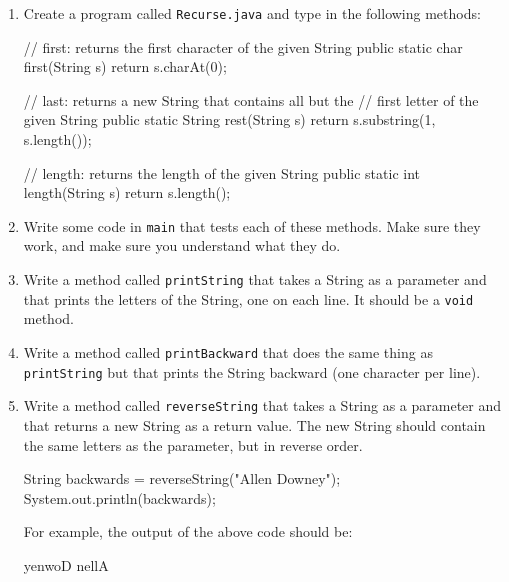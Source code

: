 \documentclass[12pt]{book}
\begin{document}
\begin{exercise}
\begin{enumerate}

\item Create a program called {\tt Recurse.java} and type in the following methods:

\begin{code}
    // first: returns the first character of the given String
    public static char first(String s) {
        return s.charAt(0);
    }

    // last: returns a new String that contains all but the
    // first letter of the given String
    public static String rest(String s) {
        return s.substring(1, s.length());
    }

    // length: returns the length of the given String
    public static int length(String s) {
        return s.length();
    }
\end{code}

\item Write some code in {\tt main} that tests each of these methods.
Make sure they work, and make sure you understand what they do.

\item Write a method called {\tt printString} that takes a String as a parameter and that prints the letters of the String, one on each line.  It should be a {\tt void} method.

\item Write a method called {\tt printBackward} that does the same thing as {\tt printString} but that prints the String backward (one character per line).

\item Write a method called {\tt reverseString} that takes a String as a parameter and that returns a new String as a return value.
The new String should contain the same letters as the parameter, but in reverse order.

\begin{code}
    String backwards = reverseString("Allen Downey");
    System.out.println(backwards);
\end{code}

For example, the output of the above code should be:

\begin{stdout}
yenwoD nellA
\end{stdout}

\end{enumerate}
\end{exercise}
\end{document}
